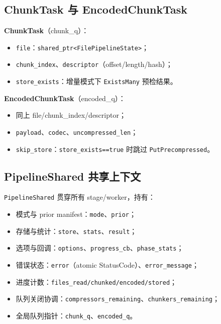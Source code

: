 \subsection{ChunkTask 与 EncodedChunkTask}

\begin{structbox}[任务载荷]
\textbf{ChunkTask}（chunk\_q）：
\begin{itemize}[nosep]
  \item \texttt{file}：\texttt{shared\_ptr<FilePipelineState>}；
  \item \texttt{chunk\_index}、\texttt{descriptor}（offset/length/hash）；
  \item \texttt{store\_exists}：增量模式下 \texttt{ExistsMany} 预检结果。
\end{itemize}

\textbf{EncodedChunkTask}（encoded\_q）：
\begin{itemize}[nosep]
  \item 同上 file/chunk\_index/descriptor；
  \item \texttt{payload}、\texttt{codec}、\texttt{uncompressed\_len}；
  \item \texttt{skip\_store}：\texttt{store\_exists==true} 时跳过 \texttt{PutPrecompressed}。
\end{itemize}
\end{structbox}

\subsection{PipelineShared 共享上下文}

\texttt{PipelineShared} 贯穿所有 stage/worker，持有：
\begin{itemize}[nosep]
  \item 模式与 prior manifest：\texttt{mode}、\texttt{prior}；
  \item 存储与统计：\texttt{store}、\texttt{stats}、\texttt{result}；
  \item 选项与回调：\texttt{options}、\texttt{progress\_cb}、\texttt{phase\_stats}；
  \item 错误状态：\texttt{error}（atomic StatusCode）、\texttt{error\_message}；
  \item 进度计数：\texttt{files\_read/chunked/encoded/stored}；
  \item 队列关闭协调：\texttt{compressors\_remaining}、\texttt{chunkers\_remaining}；
  \item 全局队列指针：\texttt{chunk\_q}、\texttt{encoded\_q}。
\end{itemize}

